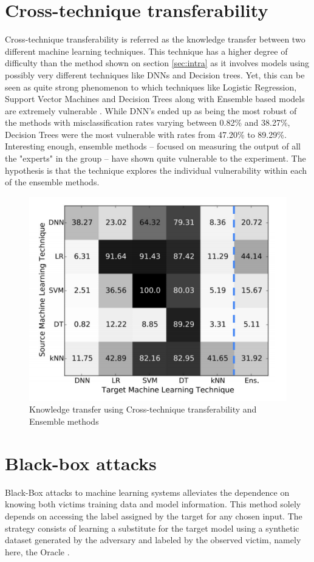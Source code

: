 \section{Cross-technique transferability}
Cross-technique transferability is referred as the knowledge transfer between two different machine learning techniques. This technique has a higher degree of difficulty than the method shown on section \ref{sec:intra} as it involves models using possibly very different techniques like DNNs and Decision trees. Yet, this can be seen as quite strong phenomenon to which techniques like Logistic Regression, Support Vector Machines and Decision Trees along with Ensemble based models are extremely vulnerable \cite{papernot2016transf}. While DNN's ended up as being the most robust of the methods with misclassification rates varying between 0.82\% and 38.27\%, Decision Trees were the most vulnerable with rates from 47.20\% to 89.29\%. Interesting enough, ensemble methods -- focused on measuring the output of all the "experts" in the group -- have shown quite vulnerable to the experiment. The hypothesis is that the technique explores the individual vulnerability within each of the ensemble methods.

\begin{figure}[!h]
	\centering
	\includegraphics[scale=0.6]{cross.png}
	\caption{Knowledge transfer using Cross-technique transferability and Ensemble methods \cite{papernot2016transf}}
	\label{fig:cross}
\end{figure}
\section{Black-box attacks}
Black-Box attacks to machine learning systems alleviates the dependence on knowing both victims training data and model information. This method solely depends on accessing the label assigned by the target for any chosen input. The strategy consists of learning a substitute for the target model using a synthetic dataset generated by the adversary and labeled by the observed victim, namely here, the Oracle \cite{papernot2016}.

